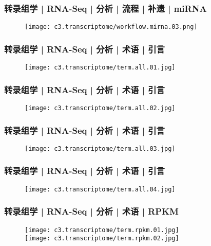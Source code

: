 \begin{frame}
  \frametitle{转录组学 | RNA-Seq | 分析 | 流程 | 补遗 | miRNA}
  \begin{figure}
    \centering
    \texttt{[image: c3.transcriptome/workflow.mirna.03.png]}
  \end{figure}
\end{frame}

\begin{frame}
  \frametitle{转录组学 | RNA-Seq | 分析 | 术语 | 引言}
  \begin{figure}
    \centering
    \texttt{[image: c3.transcriptome/term.all.01.jpg]}
  \end{figure}
\end{frame}

\begin{frame}
  \frametitle{转录组学 | RNA-Seq | 分析 | 术语 | 引言}
  \begin{figure}
    \centering
    \texttt{[image: c3.transcriptome/term.all.02.jpg]}
  \end{figure}
\end{frame}

\begin{frame}
  \frametitle{转录组学 | RNA-Seq | 分析 | 术语 | 引言}
  \begin{figure}
    \centering
    \texttt{[image: c3.transcriptome/term.all.03.jpg]}
  \end{figure}
\end{frame}

\begin{frame}
  \frametitle{转录组学 | RNA-Seq | 分析 | 术语 | 引言}
  \begin{figure}
    \centering
    \texttt{[image: c3.transcriptome/term.all.04.jpg]}
  \end{figure}
\end{frame}

\begin{frame}
  \frametitle{转录组学 | RNA-Seq | 分析 | 术语 | RPKM}
  \begin{figure}
    \centering
    \texttt{[image: c3.transcriptome/term.rpkm.01.jpg]}\\
    \vspace{1em}
    \texttt{[image: c3.transcriptome/term.rpkm.02.jpg]}
  \end{figure}
\end{frame}

